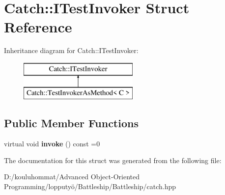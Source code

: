 \hypertarget{struct_catch_1_1_i_test_invoker}{}\section{Catch\+:\+:I\+Test\+Invoker Struct Reference}
\label{struct_catch_1_1_i_test_invoker}
Inheritance diagram for Catch\+:\+:I\+Test\+Invoker\+:\begin{figure}[H]
\begin{center}
\leavevmode
\includegraphics[height=2.000000cm]{struct_catch_1_1_i_test_invoker}
\end{center}
\end{figure}
\subsection*{Public Member Functions}
\begin{DoxyCompactItemize}
\item 
\mbox{\label{struct_catch_1_1_i_test_invoker_a6fcd5c5b67d6d5ade6491ff33411ca7f}} 
virtual void {\bfseries invoke} () const =0
\end{DoxyCompactItemize}


The documentation for this struct was generated from the following file\+:\begin{DoxyCompactItemize}
\item 
D\+:/kouluhommat/\+Advanced Object-\/\+Oriented Programming/lopputyö/\+Battleship/\+Battleship/catch.\+hpp\end{DoxyCompactItemize}
